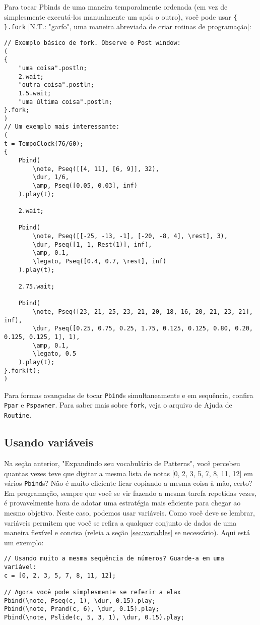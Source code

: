 Para tocar Pbinds de uma maneira temporalmente ordenada (em vez de simplesmente executá-los manualmente um após o outro), você pode usar \texttt{\{ \}.fork} [N.T.: "garfo", uma maneira abreviada de criar rotinas de programação]:

\begin{lstlisting}[style=SuperCollider-IDE, basicstyle=\scttfamily\footnotesize]
// Exemplo básico de fork. Observe o Post window:
( 
{
	"uma coisa".postln;
	2.wait;
	"outra coisa".postln;
	1.5.wait;
	"uma última coisa".postln;
}.fork;
)
// Um exemplo mais interessante:
(
t = TempoClock(76/60);
{
	Pbind(
		\note, Pseq([[4, 11], [6, 9]], 32),
		\dur, 1/6,
		\amp, Pseq([0.05, 0.03], inf)
	).play(t);
	
	2.wait;
	
	Pbind(
		\note, Pseq([[-25, -13, -1], [-20, -8, 4], \rest], 3),
		\dur, Pseq([1, 1, Rest(1)], inf),
		\amp, 0.1,
		\legato, Pseq([0.4, 0.7, \rest], inf)
	).play(t);

	2.75.wait;
	
	Pbind(
		\note, Pseq([23, 21, 25, 23, 21, 20, 18, 16, 20, 21, 23, 21], inf),
		\dur, Pseq([0.25, 0.75, 0.25, 1.75, 0.125, 0.125, 0.80, 0.20, 0.125, 0.125, 1], 1),
		\amp, 0.1,
		\legato, 0.5
	).play(t);
}.fork(t);
)
\end{lstlisting}
 
Para formas avançadas de tocar \texttt{Pbind}s simultaneamente e em sequência, confira \texttt{Ppar} e \texttt{Pspawner}. Para saber mais sobre \texttt{fork}, veja o arquivo de Ajuda de  \texttt{Routine}.

\subsection{Usando variáveis}

Na seção anterior, "Expandindo seu vocabulário de Patterns", você percebeu quantas vezes teve que digitar a mesma lista de notas [0, 2, 3, 5, 7, 8, 11, 12] em vários \texttt{Pbind}s? Não é muito eficiente ficar copiando a mesma coisa à mão, certo? Em programação, sempre que você se vir fazendo a mesma tarefa repetidas vezes, é provavelmente hora de adotar uma estratégia mais eficiente para chegar ao mesmo objetivo. Neste caso, podemos usar variáveis. Como você deve se lembrar, variáveis permitem que você se refira a qualquer conjunto de dados de uma maneira flexível e concisa (releia a seção \ref{sec:variables} se necessário). Aqui está um exemplo:

\begin{lstlisting}[style=SuperCollider-IDE, basicstyle=\scttfamily\footnotesize]
// Usando muito a mesma sequência de números? Guarde-a em uma variável:
c = [0, 2, 3, 5, 7, 8, 11, 12];

// Agora você pode simplesmente se referir a elax
Pbind(\note, Pseq(c, 1), \dur, 0.15).play;
Pbind(\note, Prand(c, 6), \dur, 0.15).play;
Pbind(\note, Pslide(c, 5, 3, 1), \dur, 0.15).play;
\end{lstlisting}
 
